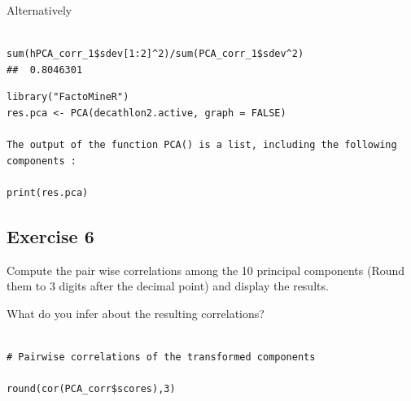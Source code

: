 \documentclass[a4paper,12pt]{article}
\begin{document}
Alternatively

\begin{framed} \begin{verbatim}

sum(hPCA_corr_1$sdev[1:2]^2)/sum(PCA_corr_1$sdev^2)
##  0.8046301
\end{verbatim}\end{framed} 

\newpage

\begin{framed}
\begin{verbatim}
library("FactoMineR")
res.pca <- PCA(decathlon2.active, graph = FALSE)

The output of the function PCA() is a list, including the following components :

print(res.pca)
\end{verbatim}
\end{framed}
\newpage 
\subsection*{Exercise 6}

Compute the pair wise correlations among the 10 principal components (Round them to 3 digits after the decimal point) and display the results. 

What do you infer about the resulting correlations?



\begin{framed} \begin{verbatim}

# Pairwise correlations of the transformed components

round(cor(PCA_corr$scores),3)
\end{verbatim}\end{framed} 
\end{document}
